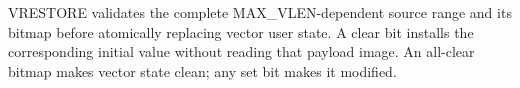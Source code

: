 VRESTORE validates the complete MAX\_VLEN-dependent source range and its bitmap before atomically replacing vector user state. A clear bit installs the corresponding initial value without reading that payload image. An all-clear bitmap makes vector state clean; any set bit makes it modified.
